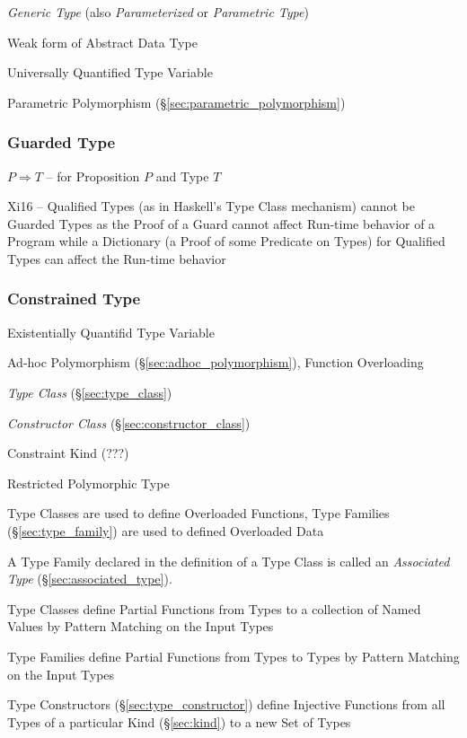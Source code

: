 \emph{Generic Type} (also \emph{Parameterized} or \emph{Parametric
  Type})

Weak form of Abstract Data Type

Universally Quantified Type Variable

Parametric Polymorphism (\S\ref{sec:parametric_polymorphism})



\subsubsection{Guarded Type}\label{sec:guarded_type}

$P \Rightarrow T$ -- for Proposition $P$ and Type $T$

Xi16 -- Qualified Types (as in Haskell's Type Class mechanism) cannot
be Guarded Types as the Proof of a Guard cannot affect Run-time
behavior of a Program while a Dictionary (a Proof of some Predicate on
Types) for Qualified Types can affect the Run-time behavior



\subsubsection{Constrained Type}\label{sec:constrained_type}

Existentially Quantifid Type Variable

Ad-hoc Polymorphism (\S\ref{sec:adhoc_polymorphism}), Function
Overloading

\emph{Type Class} (\S\ref{sec:type_class})

\emph{Constructor Class} (\S\ref{sec:constructor_class})

Constraint Kind (???) %

Restricted Polymorphic Type %

Type Classes are used to define Overloaded Functions, Type Families
(\S\ref{sec:type_family}) are used to defined Overloaded Data

A Type Family declared in the definition of a Type Class is called an
\emph{Associated Type} (\S\ref{sec:associated_type}).

Type Classes define Partial Functions from Types to a collection of
Named Values by Pattern Matching on the Input Types

\fist Type Families define Partial Functions from Types to Types by
Pattern Matching on the Input Types

\fist Type Constructors (\S\ref{sec:type_constructor}) define
Injective Functions from all Types of a particular Kind
(\S\ref{sec:kind}) to a new Set of Types

